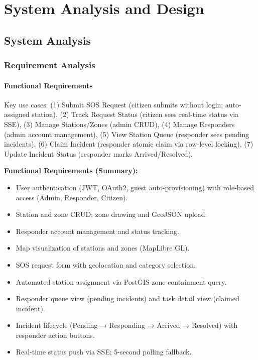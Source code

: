 \chapter{System Analysis and Design}

\section{System Analysis}

\subsection{Requirement Analysis}

\subsubsection{Functional Requirements}

Key use cases: (1) Submit SOS Request (citizen submits without login; auto-assigned station), (2) Track Request Status (citizen sees real-time status via SSE), (3) Manage Stations/Zones (admin CRUD), (4) Manage Responders (admin account management), (5) View Station Queue (responder sees pending incidents), (6) Claim Incident (responder atomic claim via row-level locking), (7) Update Incident Status (responder marks Arrived/Resolved).

\textbf{Functional Requirements (Summary):}
\begin{itemize}
  \item User authentication (JWT, OAuth2, guest auto-provisioning) with role-based access (Admin, Responder, Citizen).
  \item Station and zone CRUD; zone drawing and GeoJSON upload.
  \item Responder account management and status tracking.
  \item Map visualization of stations and zones (MapLibre GL).
  \item SOS request form with geolocation and category selection.
  \item Automated station assignment via PostGIS zone containment query.
  \item Responder queue view (pending incidents) and task detail view (claimed incident).
  \item Incident lifecycle (Pending → Responding → Arrived → Resolved) with responder action buttons.
  \item Real-time status push via SSE; 5-second polling fallback.
\end{itemize}

